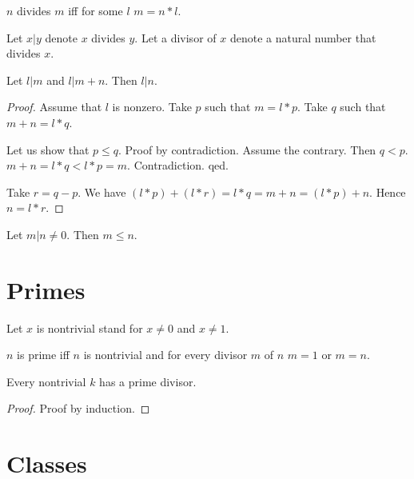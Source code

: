 \documentclass[11pt]{article}
\begin{document}
\begin{forthel}

\begin{definition}
  $n$ divides $m$ iff for some $l$ $m = n * l$.
\end{definition}

Let $x | y$ denote $x$ divides $y$.
Let a divisor of $x$ denote a natural number 
that divides $x$.

\begin{lemma} Let $l | m$ and $l | m + n$. Then $l | n$.
\end{lemma}

\begin{proof}
Assume that $l$ is nonzero.
Take $p$ such that $m = l * p$. 
Take $q$ such that $m + n = l * q$.

Let us show that 
$p \leq q$.
Proof by contradiction.
Assume the contrary. Then $q < p$.
$m+n = l * q < l * p = m$.
Contradiction. qed.

Take $r = q - p$.
We have $(l * p) + (l * r) = l * q = m + n = (l * p) + n$.
Hence $n = l * r$.
\end{proof}

\begin{lemma} Let $m | n \neq 0$. Then $m \leq n$.
\end{lemma}

\end{forthel}

\section{Primes}

\begin{forthel}

Let $x$ is nontrivial stand for $x \neq 0$ and $x \neq 1$.

\begin{definition}
$n$ is prime iff $n$ is nontrivial and
    for every divisor $m$ of $n$ $m = 1$ or $m = n$.
\end{definition}

\begin{lemma} Every nontrivial $k$ has a prime divisor.
\end{lemma}
\begin{proof} Proof by induction.
\end{proof}

\end{forthel}

\section{Classes}
\end{document}

